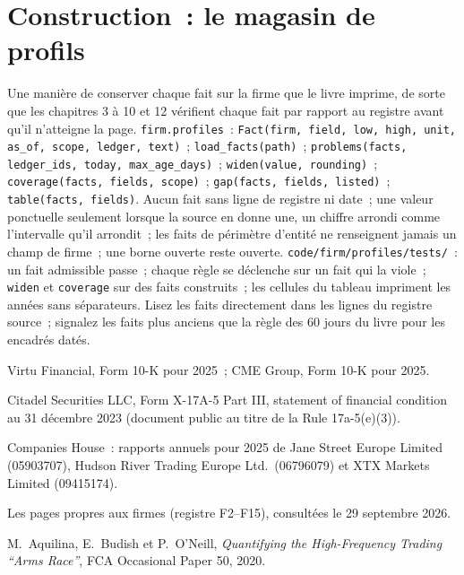 \section{Construction~: le magasin de profils}\label{bld:in:proprietary-market-makers-and-high-frequency-firms:profiles}

\begin{build}
 Une manière de conserver chaque fait sur la firme que le livre imprime, de sorte que les chapitres 3 à 10 et 12 vérifient chaque fait par rapport
au registre avant qu'il n'atteigne la page.
 \texttt{firm.profiles}~: \texttt{Fact(firm, field, low, high, unit, as\_of, scope, ledger, text)}~;
\texttt{load\_facts(path)}~; \texttt{problems(facts, ledger\_ids, today, max\_age\_days)}~;
\texttt{widen(value, rounding)}~; \texttt{coverage(facts, fields, scope)}~; \texttt{gap(facts, fields, listed)}~; \texttt{table(facts, fields)}.
 Aucun fait sans ligne de registre ni date~; une valeur ponctuelle seulement lorsque la source en donne une, un chiffre arrondi
comme l'intervalle qu'il arrondit~; les faits de périmètre d'entité ne renseignent jamais un champ de firme~; une borne ouverte reste ouverte.
 \texttt{code/firm/profiles/tests/}~: un fait admissible passe~; chaque règle se déclenche sur un fait qui
la viole~; \texttt{widen} et \texttt{coverage} sur des faits construits~; les cellules du tableau impriment les années sans séparateurs.
 Lisez les faits directement dans les lignes du registre source~; signalez les faits plus anciens que la règle des 60 jours du livre pour
les encadrés datés.
\end{build}

\begin{omsources}
\item Virtu Financial, Form 10-K pour 2025~; CME Group, Form 10-K pour 2025.
\item Citadel Securities LLC, Form X-17A-5 Part III, statement of financial condition au 31 décembre 2023 (document public
au titre de la Rule 17a-5(e)(3)).
\item Companies House~: rapports annuels pour 2025 de Jane Street Europe Limited (05903707), Hudson River Trading Europe
Ltd.\ (06796079) et XTX Markets Limited (09415174).
\item Les pages propres aux firmes (registre F2--F15), consultées le 29 septembre 2026.
\item M.~Aquilina, E.~Budish et P.~O'Neill, \emph{Quantifying the High-Frequency Trading ``Arms Race''}, FCA Occasional
Paper 50, 2020.
\end{omsources}

